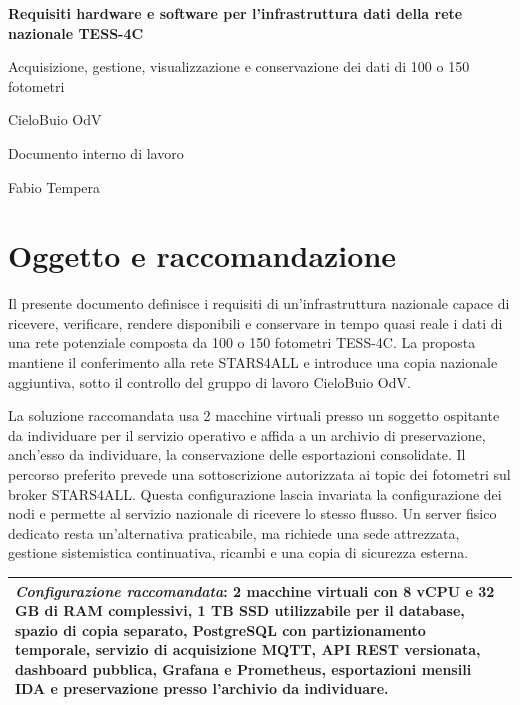 \documentclass[11pt,a4paper]{report}
\newcommand{\infobox}[1]{%

  \begin{center}

  \renewcommand{\arraystretch}{1.5}

  \begin{tabularx}{\linewidth}{X}
    \arrayrulecolor{linegray}
    \toprule
    #1 \\
    \bottomrule
  \end{tabularx}

  \end{center}

}
\begin{document}
\begin{center}

{\LARGE\bfseries\color{nightblue} Requisiti hardware e software per l'infrastruttura dati della rete nazionale TESS-4C\par}

\vspace{0.2cm}

{\large Acquisizione, gestione, visualizzazione e conservazione dei dati di 100 o 150 fotometri\par}

\vspace{0.1cm}

{\small CieloBuio OdV\par}

{\small Documento interno di lavoro\par}

{\small Fabio Tempera}

\end{center}

\section*{Oggetto e raccomandazione}

Il presente documento definisce i requisiti di un'infrastruttura nazionale capace di ricevere, verificare, rendere disponibili e conservare in tempo quasi reale i dati di una rete potenziale composta da 100 o 150 fotometri TESS-4C. La proposta mantiene il conferimento alla rete STARS4ALL e introduce una copia nazionale aggiuntiva, sotto il controllo del gruppo di lavoro CieloBuio OdV.

La soluzione raccomandata usa 2 macchine virtuali presso un soggetto ospitante da individuare per il servizio operativo e affida a un archivio di preservazione, anch'esso da individuare, la conservazione delle esportazioni consolidate. Il percorso preferito prevede una sottoscrizione autorizzata ai topic dei fotometri sul broker STARS4ALL. Questa configurazione lascia invariata la configurazione dei nodi e permette al servizio nazionale di ricevere lo stesso flusso. Un server fisico dedicato resta un'alternativa praticabile, ma richiede una sede attrezzata, gestione sistemistica continuativa, ricambi e una copia di sicurezza esterna.

\infobox{%
\textit{Configurazione raccomandata}: 2 macchine virtuali con 8 vCPU e 32 GB di RAM complessivi, 1 TB SSD utilizzabile per il database, spazio di copia separato, PostgreSQL con partizionamento temporale, servizio di acquisizione MQTT, API REST versionata, dashboard pubblica, Grafana e Prometheus, esportazioni mensili IDA e preservazione presso l'archivio da individuare.
}
\end{document}
